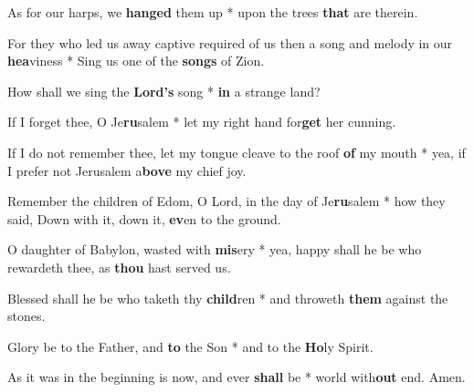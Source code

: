 \begin{multicols}{2}
	As for our harps, we \textbf{hanged} them up * upon the trees \textbf{that} are therein.
	
	For they who led us away captive required of us then a song and melody in our \textbf{hea}viness * Sing us one of the \textbf{songs} of Zion.
	
	How shall we sing the \textbf{Lord's} song * \textbf{in} a strange land?
	
	If I forget thee, O Je\textbf{ru}salem * let my right hand for\textbf{get} her cunning.
	
	If I do not remember thee, let my tongue cleave to the roof \textbf{of} my mouth * yea, if I prefer not Jerusalem a\textbf{bove} my chief joy.
	
	Remember the children of Edom, O Lord, in the day of Je\textbf{ru}salem * how they said, Down with it, down it, \textbf{ev}en to the ground.
	
	O daughter of Babylon, wasted with \textbf{mis}ery * yea, happy shall he be who rewardeth thee, as \textbf{thou} hast served us.
	
	Blessed shall he be who taketh thy \textbf{child}ren * and throweth \textbf{them} against the stones.
	
	Glory be to the Father, and \textbf{to} the Son * and to the \textbf{Ho}ly Spirit.
	
	As it was in the beginning is now, and ever \textbf{shall} be * world with\textbf{out} end. Amen.
\end{multicols}